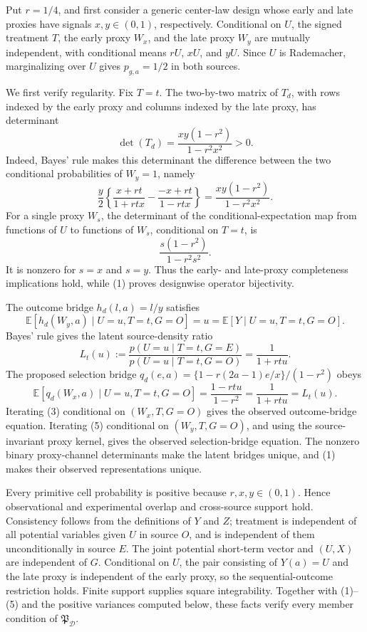 Put \(r=1/4\), and first consider a generic center-law design whose early and late proxies have signals \(x,y\in(0,1)\), respectively. Conditional on \(U\), the signed treatment \(T\), the early proxy \(W_x\), and the late proxy \(W_y\) are mutually independent, with conditional means \(rU\), \(xU\), and \(yU\). Since \(U\) is Rademacher, marginalizing over \(U\) gives \(p_{g,a}=1/2\) in both sources.

We first verify regularity. Fix \(T=t\). The two-by-two matrix of \(T_d\), with rows indexed by the early proxy and columns indexed by the late proxy, has determinant
\[
 \det(T_d)=\frac{xy(1-r^2)}{1-r^2x^2}>0. \tag{1}
\]
Indeed, Bayes' rule makes this determinant the difference between the two conditional probabilities of \(W_y=1\), namely
\[
 \frac y2\left\{
 \frac{x+rt}{1+rtx}-\frac{-x+rt}{1-rtx}
 \right\}
 =\frac{xy(1-r^2)}{1-r^2x^2}.
\]
For a single proxy \(W_s\), the determinant of the conditional-expectation map from functions of \(U\) to functions of \(W_s\), conditional on \(T=t\), is
\[
 \frac{s(1-r^2)}{1-r^2s^2}. \tag{2}
\]
It is nonzero for \(s=x\) and \(s=y\). Thus the early- and late-proxy completeness implications hold, while (1) proves designwise operator bijectivity.

The outcome bridge \(h_d(l,a)=l/y\) satisfies
\[
 \mathbb E[h_d(W_y,a)\mid U=u,T=t,G=O]=u
 =\mathbb E[Y\mid U=u,T=t,G=O]. \tag{3}
\]
Bayes' rule gives the latent source-density ratio
\[
 L_t(u):=\frac{p(U=u\mid T=t,G=E)}{p(U=u\mid T=t,G=O)}
 =\frac1{1+rtu}. \tag{4}
\]
The proposed selection bridge \(q_d(e,a)=\{1-r(2a-1)e/x\}/(1-r^2)\) obeys
\[
 \mathbb E[q_d(W_x,a)\mid U=u,T=t,G=O]
 =\frac{1-rtu}{1-r^2}
 =\frac1{1+rtu}=L_t(u). \tag{5}
\]
Iterating (3) conditional on \((W_x,T,G=O)\) gives the observed outcome-bridge equation. Iterating (5) conditional on \((W_y,T,G=O)\), and using the source-invariant proxy kernel, gives the observed selection-bridge equation. The nonzero binary proxy-channel determinants make the latent bridges unique, and (1) makes their observed representations unique.

Every primitive cell probability is positive because \(r,x,y\in(0,1)\). Hence observational and experimental overlap and cross-source support hold. Consistency follows from the definitions of \(Y\) and \(Z\); treatment is independent of all potential variables given \(U\) in source \(O\), and is independent of them unconditionally in source \(E\). The joint potential short-term vector and \((U,X)\) are independent of \(G\). Conditional on \(U\), the pair consisting of \(Y(a)=U\) and the late proxy is independent of the early proxy, so the sequential-outcome restriction holds. Finite support supplies square integrability. Together with (1)--(5) and the positive variances computed below, these facts verify every member condition of \(\mathfrak P_{\mathcal D}\).

